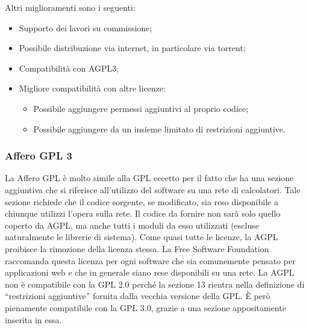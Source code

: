 Altri miglioramenti sono i seguenti:

\begin{itemize}

\item Supporto dei lavori su commissione;
\item Possibile distribuzione via internet, in particolare via torrent;
\item Compatibilità con AGPL3;
\item Migliore compatibilità con altre licenze:
  \begin{itemize}
  \item Possibile aggiungere permessi aggiuntivi al proprio codice;
  \item Possibile aggiungere da un insieme limitato di restrizioni aggiuntive.
  \end{itemize}

\end{itemize}

\subsubsection{Affero GPL 3}

La Affero GPL è molto simile alla GPL eccetto per il fatto che ha una sezione aggiuntiva che si riferisce all'utilizzo del software su una rete di calcolatori. Tale sezione richiede che il codice sorgente, se modificato, sia reso disponibile a chiunque utilizzi l'opera sulla rete. Il codice da fornire non sarà solo quello coperto da AGPL, ma anche tutti i moduli da esso utilizzati (escluse naturalmente le librerie di sistema). Come quasi tutte le licenze, la AGPL proibisce la rimozione della licenza stessa. La Free Software Foundation raccomanda questa licenza per ogni software che sia comunemente pensato per applicazioni web e che in generale siano rese disponibili su una rete. La AGPL non è compatibile con la GPL 2.0 perché la sezione 13 rientra nella definizione di ``restrizioni aggiuntive'' fornita dalla vecchia versione della GPL. È però pienamente compatibile con la GPL 3.0, grazie a una sezione appositamente inserita in essa.